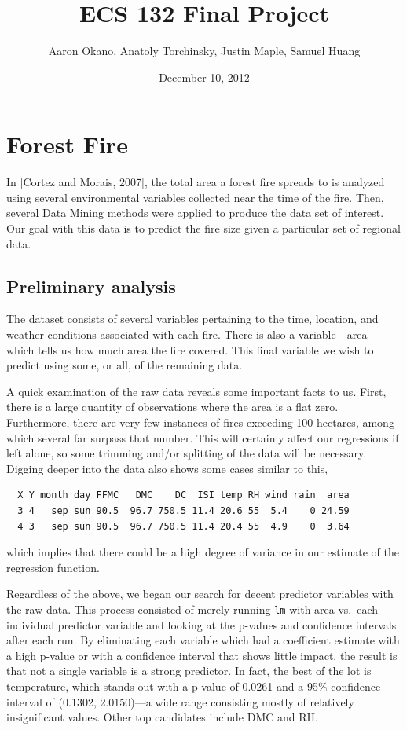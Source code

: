 \documentclass{article}
\title{ECS 132 Final Project}  %
\author{Aaron Okano, Anatoly Torchinsky, Justin Maple, Samuel Huang }    %
\date{December 10, 2012}   %
\begin{document}

\maketitle                 %



\section{Forest Fire}

In [Cortez and Morais, 2007], the total area a forest fire spreads to is
analyzed using several environmental variables collected near the time of the
fire. Then, several Data Mining methods were applied to produce the data set
of interest. Our goal with this data is to predict the fire size given a
particular set of regional data.

\subsection{Preliminary analysis}

The dataset consists of several variables pertaining to the time, location, and
weather conditions associated with each fire. There is also a
variable---area---which tells us how much area the fire covered. This final
variable we wish to predict using some, or all, of the remaining data.

A quick examination of the raw data reveals some important facts to us. First,
there is a large quantity of observations where the area is a flat zero.
Furthermore, there are very few instances of fires exceeding 100 hectares,
among which several far surpass that number. This will certainly affect our
regressions if left alone, so some trimming and/or splitting of the data will
be necessary. Digging deeper into the data also shows some cases similar to
this,
\begin{verbatim}
  X Y month day FFMC   DMC    DC  ISI temp RH wind rain  area
  3 4   sep sun 90.5  96.7 750.5 11.4 20.6 55  5.4    0 24.59
  4 3   sep sun 90.5  96.7 750.5 11.4 20.4 55  4.9    0  3.64
\end{verbatim}
which implies that there could be a high degree of variance in our estimate of
the regression function.

Regardless of the above, we began our search for decent predictor variables
with the raw data. This process consisted of merely running \verb=lm= with area
vs.\ each individual predictor variable and looking at the p-values and
confidence intervals after each run. By eliminating each variable which had a
coefficient estimate with a high p-value or with a confidence interval that
shows little impact, the result is that not a single variable is a strong
predictor. In fact, the best of the lot is temperature, which stands out with a
p-value of 0.0261 and a 95\% confidence interval of (0.1302, 2.0150)---a
wide range consisting mostly of relatively insignificant values. Other top
candidates include DMC and RH.
\end{document}
